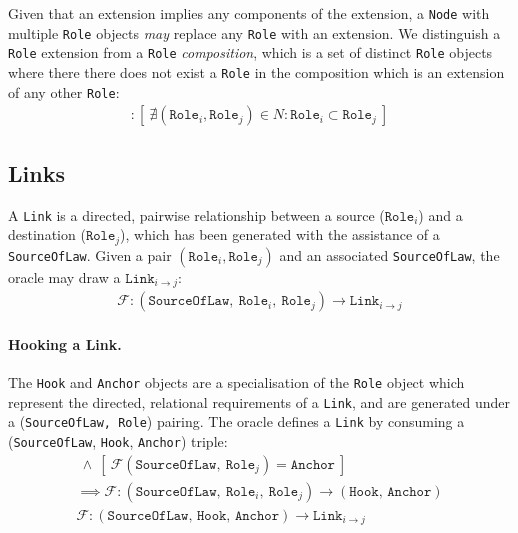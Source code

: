 \documentclass{article}
\numberwithin{equation}{section}
\begin{document}
Given that an extension implies any components of the extension, a \texttt{Node} with multiple \texttt{Role} objects \textit{may} replace any \texttt{Role} with an extension. We distinguish a \texttt{Role} extension from a \texttt{Role} \textit{composition}, which is a set of distinct \texttt{Role} objects where there there does not exist a \texttt{Role} in the composition which is an extension of any other \texttt{Role}:
\begin{align}
	[ \ N := \ \{ \ \texttt{Role}_0, .., \texttt{Role}_n \ \} \ ] : [ \ \nexists (\texttt{Role}_i, \texttt{Role}_j) \in N : \texttt{Role}_i \subset \texttt{Role}_j \ ]
\end{align}



\subsection{Links}\label{section:links}

A \texttt{Link} is a directed, pairwise relationship between a source ($\texttt{Role}_i$) and a destination ($\texttt{Role}_j$), which has been generated with the assistance of a \texttt{SourceOfLaw}. Given a pair $(\texttt{Role}_i, \texttt{Role}_j)$ and an associated \texttt{SourceOfLaw}, the oracle may draw a $\texttt{Link}_{i \rightarrow j}$:
\begin{align}
	\mathcal{F} : (\texttt{SourceOfLaw}, \ \texttt{Role}_i, \ \texttt{Role}_j) \rightarrow  \texttt{Link}_{i \rightarrow j}
\end{align}

\paragraph{Hooking a Link.} The \texttt{Hook} and \texttt{Anchor} objects are a specialisation of the \texttt{Role} object which represent the directed, relational requirements of a \texttt{Link}, and are generated under a (\texttt{SourceOfLaw, Role}) pairing. The oracle defines a \texttt{Link} by consuming a (\texttt{SourceOfLaw}, \texttt{Hook}, \texttt{Anchor}) triple:
\begin{align}
	[ \ \mathcal{F}(\texttt{SourceOfLaw}, \ \texttt{Role}_i) = \texttt{Hook} \ ] \ \land \ [ \ \mathcal{F}(\texttt{SourceOfLaw}, \ \texttt{Role}_j) = \texttt{Anchor} \ ] \\
	\implies \mathcal{F}: (\texttt{SourceOfLaw}, \ \texttt{Role}_i, \ \texttt{Role}_j) \rightarrow (\texttt{Hook, Anchor}) \\ 
	\mathcal{F} : (\texttt{SourceOfLaw, Hook, Anchor}) \rightarrow \texttt{Link}_{i \rightarrow j}
\end{align}
\end{document}
